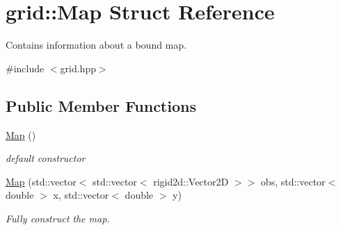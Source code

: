 \hypertarget{structgrid_1_1Map}{}\section{grid\+:\+:Map Struct Reference}
\label{structgrid_1_1Map}


Contains information about a bound map.  




{\ttfamily \#include $<$grid.\+hpp$>$}

\subsection*{Public Member Functions}
\begin{DoxyCompactItemize}
\item 
\mbox{\label{structgrid_1_1Map_aeedaf34b4dcd443691c796637cea73ce}} 
\hyperlink{structgrid_1_1Map_aeedaf34b4dcd443691c796637cea73ce}{Map} ()
\begin{DoxyCompactList}\small\item\em default constructor \end{DoxyCompactList}\item 
\hyperlink{structgrid_1_1Map_a124140efcef69cee1d90f5d81d01e8fa}{Map} (std\+::vector$<$ std\+::vector$<$ rigid2d\+::\+Vector2D $>$$>$ obs, std\+::vector$<$ double $>$ x, std\+::vector$<$ double $>$ y)
\begin{DoxyCompactList}\small\item\em Fully construct the map. \end{DoxyCompactList}\end{DoxyCompactItemize}
